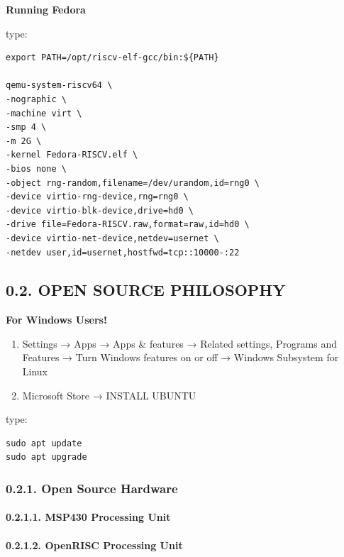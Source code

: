 \documentclass[
]{article}
\begin{document}
\textbf{Running Fedora}

type:

\begin{verbatim}
export PATH=/opt/riscv-elf-gcc/bin:${PATH}

qemu-system-riscv64 \
-nographic \
-machine virt \
-smp 4 \
-m 2G \
-kernel Fedora-RISCV.elf \
-bios none \
-object rng-random,filename=/dev/urandom,id=rng0 \
-device virtio-rng-device,rng=rng0 \
-device virtio-blk-device,drive=hd0 \
-drive file=Fedora-RISCV.raw,format=raw,id=hd0 \
-device virtio-net-device,netdev=usernet \
-netdev user,id=usernet,hostfwd=tcp::10000-:22
\end{verbatim}

\hypertarget{open-source-philosophy}{%
\subsection{0.2. OPEN SOURCE PHILOSOPHY}\label{open-source-philosophy}}

\textbf{For Windows Users!}

\begin{enumerate}
\def\labelenumi{\arabic{enumi}.}
\item
  Settings → Apps → Apps \& features → Related settings, Programs and
  Features → Turn Windows features on or off → Windows Subsystem for
  Linux
\item
  Microsoft Store → INSTALL UBUNTU
\end{enumerate}

type:

\begin{verbatim}
sudo apt update
sudo apt upgrade
\end{verbatim}

\hypertarget{open-source-hardware}{%
\subsubsection{0.2.1. Open Source Hardware}\label{open-source-hardware}}

\hypertarget{msp430-processing-unit}{%
\paragraph{0.2.1.1. MSP430 Processing
Unit}\label{msp430-processing-unit}}

\hypertarget{openrisc-processing-unit}{%
\paragraph{0.2.1.2. OpenRISC Processing
Unit}\label{openrisc-processing-unit}}
\end{document}

